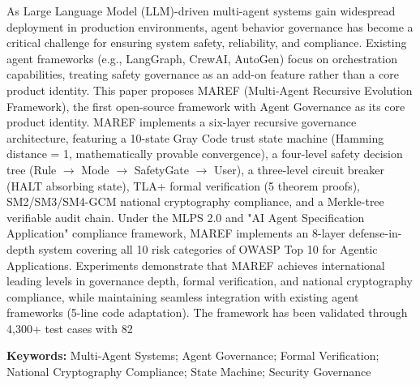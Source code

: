 \documentclass[10pt,twocolumn]{article}
\newcommand{\enkeyword}[1]{\textbf{Keywords:} #1}
\begin{document}
\begin{enabstract}
\noindent
As Large Language Model (LLM)-driven multi-agent systems gain widespread deployment in production environments, agent behavior governance has become a critical challenge for ensuring system safety, reliability, and compliance. Existing agent frameworks (e.g., LangGraph, CrewAI, AutoGen) focus on orchestration capabilities, treating safety governance as an add-on feature rather than a core product identity. This paper proposes MAREF (Multi-Agent Recursive Evolution Framework), the first open-source framework with Agent Governance as its core product identity. MAREF implements a six-layer recursive governance architecture, featuring a 10-state Gray Code trust state machine (Hamming distance = 1, mathematically provable convergence), a four-level safety decision tree (Rule $\rightarrow$ Mode $\rightarrow$ SafetyGate $\rightarrow$ User), a three-level circuit breaker (HALT absorbing state), TLA+ formal verification (5 theorem proofs), SM2/SM3/SM4-GCM national cryptography compliance, and a Merkle-tree verifiable audit chain. Under the MLPS 2.0 and "AI Agent Specification Application" compliance framework, MAREF implements an 8-layer defense-in-depth system covering all 10 risk categories of OWASP Top 10 for Agentic Applications. Experiments demonstrate that MAREF achieves international leading levels in governance depth, formal verification, and national cryptography compliance, while maintaining seamless integration with existing agent frameworks (5-line code adaptation). The framework has been validated through 4,300+ test cases with 82%

\enkeyword{Multi-Agent Systems; Agent Governance; Formal Verification; National Cryptography Compliance; State Machine; Security Governance}
\end{enabstract}





\end{document}
